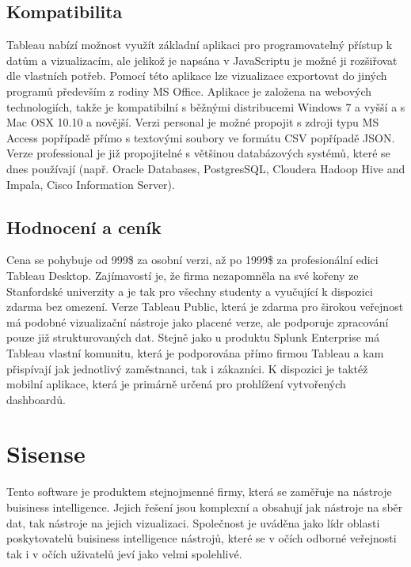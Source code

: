 \documentclass[czech,BP]{thesiskiv2}
\begin{document}
 \subsection{Kompatibilita}
 Tableau nabízí možnost využít základní aplikaci pro programovatelný přístup k datům a vizualizacím, ale jelikož je napsána v JavaScriptu je možné ji rozšiřovat dle vlastních potřeb. Pomocí této aplikace lze vizualizace exportovat do jiných programů především z rodiny MS Office. Aplikace je založena na webových technologiích, takže je kompatibilní s běžnými distribucemi Windows 7 a vyšší a s Mac OSX 10.10 a novější. Verzi personal je možné propojit s zdroji typu MS Access popřípadě přímo s textovými soubory ve formátu CSV popřípadě JSON. Verze professional je již propojitelné s většinou databázových systémů, které se dnes používají (např. Oracle Databases, PostgresSQL, Cloudera Hadoop Hive and Impala, Cisco Information Server).\cite{TableauSources}
 
 \subsection{Hodnocení a ceník}
 Cena se pohybuje od 999\$ za osobní verzi, až po 1999\$ za profesionální edici Tableau Desktop.\cite{TableauPricing} Zajímavostí je, že firma nezapomněla na své kořeny ze Stanfordské univerzity a je tak pro všechny studenty a vyučující k dispozici zdarma bez omezení. Verze Tableau Public, která je zdarma pro širokou veřejnost má podobné vizualizační nástroje jako placené verze, ale podporuje zpracování pouze již strukturovaných dat. Stejně jako u produktu Splunk Enterprise má Tableau vlastní komunitu, která je podporována přímo firmou Tableau a kam přispívají jak jednotlivý zaměstnanci, tak i zákazníci. K dispozici je taktéž mobilní aplikace, která je primárně určená pro prohlížení vytvořených dashboardů. 
 
 
 \section{Sisense}
  Tento software je produktem stejnojmenné firmy, která se zaměřuje na nástroje buisiness intelligence. Jejich řešení jsou komplexní a obsahují jak nástroje na sběr dat, tak nástroje na jejich vizualizaci. Společnost je uváděna jako lídr oblasti poskytovatelů buisiness intelligence nástrojů, které se v očích odborné veřejnosti tak i v očích uživatelů jeví jako velmi spolehlivé.\cite{SisenseStandings}
 
\end{document}
